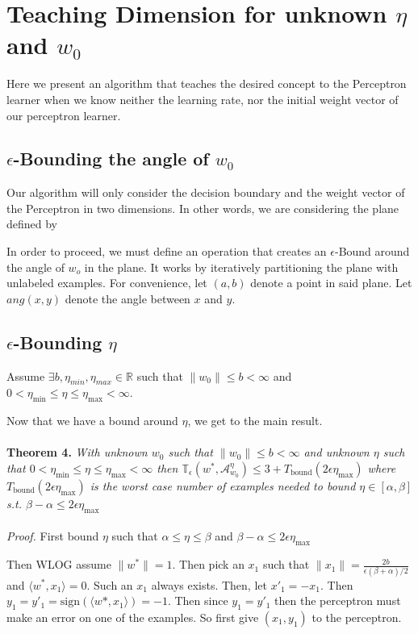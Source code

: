\documentclass{article}
\newcommand{\learn}{\mathcal{A}_{w_0}^\eta}
\begin{document}
\section{Teaching Dimension for unknown $\eta$ and $w_0$}
Here we present an algorithm that teaches the desired concept to the Perceptron learner when we know neither the learning rate, nor the initial weight vector of
our perceptron learner.

\subsection{$\epsilon$-Bounding the angle of $w_0$}
Our algorithm will only consider the decision boundary and the weight vector of
the Perceptron in two dimensions. In other words, we are considering the plane
defined by

In order to proceed, we must define an operation that creates an
$\epsilon$-Bound around the angle of $w_o$ in the plane. It works by iteratively
partitioning the plane with unlabeled examples. For convenience, let $(a,b)$
denote a point in said plane. Let $ang(x,y)$ denote the angle between $x$ and
$y$.



\subsection{$\epsilon$-Bounding $\eta$}

Assume $\exists b, \eta_{min}, \eta_{max} \in \mathbb{R}$ such that $\lVert w_0
\rVert \leq b < \infty$ and $0 < \eta_{\min} \leq \eta \leq \eta_{\max} <
\infty$. 



Now that we have a bound around $\eta$, we get to the main result.
\\
\\
\textbf{Theorem 4.} 
\textit{With unknown $w_0$ such that $\lVert w_0 \rVert \leq b < \infty$
and unknown $\eta$ such that $0 < \eta_{\min} \leq \eta \leq \eta_{\max} < \infty$ then 
$
\mathbb{T}_\epsilon(w^* , \learn) \leq 3 + T_{\text{bound}}(2\epsilon \eta_{\max})
$
where $T_{\text{bound}}(2\epsilon \eta_{\max})$ is the worst case number of examples needed to bound $\eta \in [\alpha , \beta]$ s.t. $\beta - \alpha \leq 2\epsilon \eta_{\max}$
}
\\
\\
\textit{Proof.}
First bound $\eta$ such that $ \alpha \leq \eta \leq \beta$ and $\beta - \alpha \leq 2\epsilon \eta_{\max}$

Then WLOG assume $\lVert w^* \rVert = 1$. Then pick an $x_1$ such that 
$\lVert x_1 \rVert = \frac{2b}{\epsilon (\beta + \alpha)/2}$ and $\langle w^*, x_1 \rangle = 0$. Such an $x_1$ always exists. Then, let $x'_1 = -x_1.$ Then $y_1 = y'_1 = \text{sign}(\langle w*, x_1 \rangle) = -1$.  Then since $y_1 = y'_1$ then the perceptron must make an error on one of the examples. So first give $(x_1, y_1)$ to the perceptron.
\end{document}
